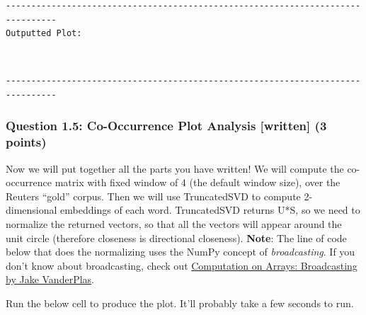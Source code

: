 \documentclass[11pt]{article}
\begin{document}
    \begin{Verbatim}[commandchars=\\\{\}]
--------------------------------------------------------------------------------
Outputted Plot:
    \end{Verbatim}

    \begin{center}
    \end{center}
    { \hspace*{\fill} \\}
    
    \begin{Verbatim}[commandchars=\\\{\}]
--------------------------------------------------------------------------------
    \end{Verbatim}

    \subsubsection{Question 1.5: Co-Occurrence Plot Analysis {[}written{]}
(3
points)}\label{question-1.5-co-occurrence-plot-analysis-written-3-points}

Now we will put together all the parts you have written! We will compute
the co-occurrence matrix with fixed window of 4 (the default window
size), over the Reuters ``gold'' corpus. Then we will use TruncatedSVD
to compute 2-dimensional embeddings of each word. TruncatedSVD returns
U*S, so we need to normalize the returned vectors, so that all the
vectors will appear around the unit circle (therefore closeness is
directional closeness). \textbf{Note}: The line of code below that does
the normalizing uses the NumPy concept of \emph{broadcasting}. If you
don't know about broadcasting, check out
\href{https://jakevdp.github.io/PythonDataScienceHandbook/02.05-computation-on-arrays-broadcasting.html}{Computation
on Arrays: Broadcasting by Jake VanderPlas}.

Run the below cell to produce the plot. It'll probably take a few
seconds to run.
\end{document}
